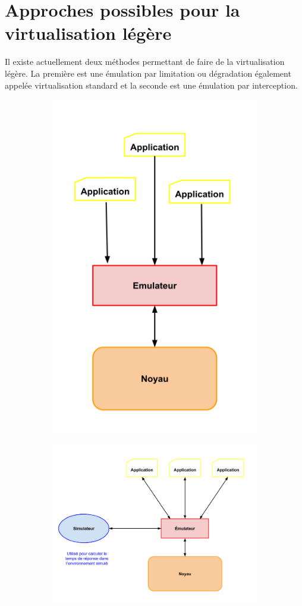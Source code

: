 \section{Approches possibles pour la virtualisation légère}
\label{section:emulation}

Il existe actuellement deux méthodes permettant de faire de la virtualisation
légère. La première est une émulation par limitation ou dégradation également
appelée virtualisation standard et la seconde est une émulation par
interception.

\begin{figure}[H]
  \centering 
  \begin{subfigure}{0.3\textwidth}
    \includegraphics[scale=0.35]{Pictures/png/Virtualisation_limitation}
  \end{subfigure}
  \begin{subfigure}{0.3\textwidth}
    \includegraphics[scale=0.3]{Pictures/png/Virtualisation_interception}

\end{subfigure}
\end{figure}
